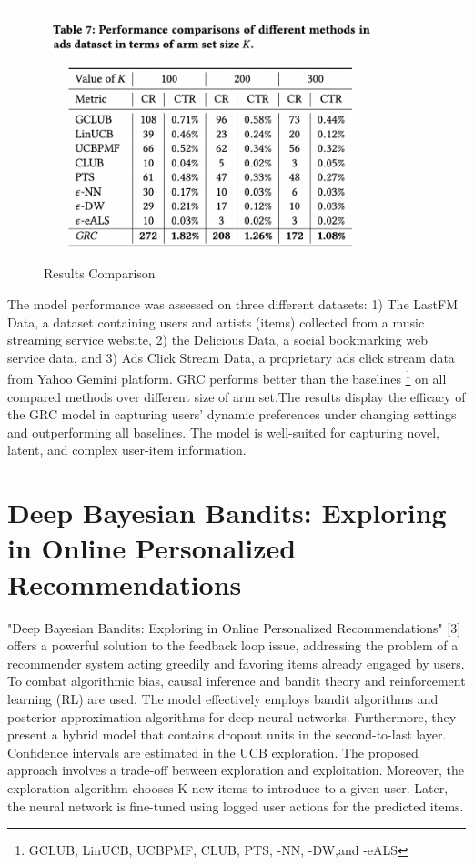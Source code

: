 \begin{figure}[hh!]
    \centering
    \includegraphics[width=100mm]{results_GRC.png}
    \caption{Results Comparison
    \label{overflow}}
\end{figure}
The model performance was assessed on three different datasets: 1) The LastFM Data, a dataset containing  users and artists (items) collected from a music streaming service website, 2) the Delicious Data, a social bookmarking web service data, and 3) Ads Click Stream Data, a proprietary ads click stream data from Yahoo Gemini platform. GRC performs better than the baselines \footnote {GCLUB, LinUCB, UCBPMF, CLUB, PTS, \textepsilon-NN, \textepsilon-DW,and \textepsilon-eALS} on all compared methods over different size of arm set.The results display the efficacy of the GRC model in capturing users’ dynamic preferences under changing settings and outperforming all baselines. The model is well-suited for capturing novel, latent, and complex user-item information.

\section{Deep Bayesian Bandits: Exploring in Online Personalized
Recommendations}
"Deep Bayesian Bandits: Exploring in  Online Personalized Recommendations" [3] offers a powerful solution to the feedback loop issue, addressing the problem of a recommender system acting greedily and favoring items already engaged by users. To combat algorithmic bias, causal inference and bandit theory and reinforcement learning (RL) are used. The model effectively employs bandit algorithms and posterior approximation algorithms for deep neural networks. Furthermore, they present a hybrid model that contains dropout units in the second-to-last layer. Confidence intervals are estimated in the UCB exploration. The proposed approach involves a trade-off between exploration and exploitation. Moreover, the exploration algorithm chooses K new items to introduce to a given user. Later, the neural network is fine-tuned using logged user actions for the predicted items. 

